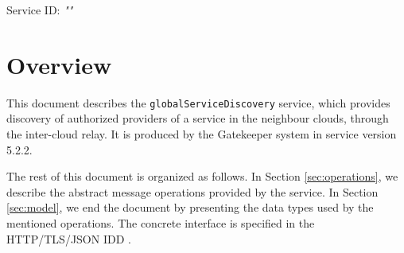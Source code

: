 \documentclass[a4paper]{arrowhead}
\begin{document}
\sloppy

\ArrowheadSetup

\begin{center}
  \vspace*{1cm}
  \huge{\arrowtitle}

  \vspace*{0.2cm}
  \LARGE{\arrowtype}
  \vspace*{1cm}

  \Large{Service ID: \textit{"\arrowid"}}

  \vspace*{\fill}


  \vspace*{1cm}
  \vspace*{\fill}

  \begin{abstract}
    This document describes the \texttt{global\allowbreak{}Service\allowbreak{}Discovery} service, version 5.2.2, produced by the Gatekeeper support system of Arrowhead 5.2.2.
  \end{abstract}

  \vspace*{1cm}
\end{center}

\newpage

\tableofcontents
\newpage

\section{Overview}
\label{sec:overview}

This document describes the \texttt{global\allowbreak{}Service\allowbreak{}Discovery} service, which provides discovery of authorized providers of a service in the neighbour clouds, through the inter-cloud relay.
It is produced by the Gatekeeper system \cite{gk-sysd} in service version 5.2.2.

The rest of this document is organized as follows.
In Section \ref{sec:operations}, we describe the abstract message operations provided by the service.
In Section \ref{sec:model}, we end the document by presenting the data types used by the mentioned operations.
The concrete interface is specified in the HTTP/TLS/JSON IDD \cite{gk-globalServiceDiscovery-http-idd}.
\end{document}
